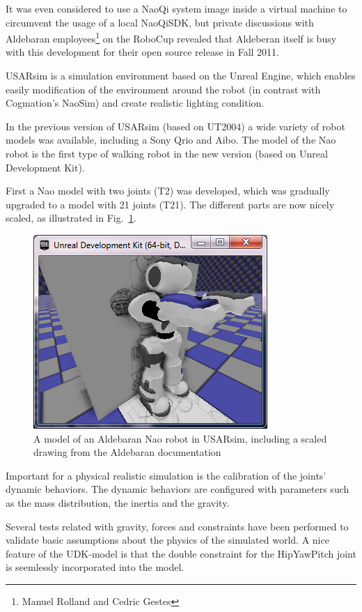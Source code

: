 \documentclass[a4paper]{article}
\begin{document}
It was even considered to use a NaoQi system image inside a virtual machine to circumvent the usage of a local NaoQiSDK, but private discussions with Aldebaran employees\footnote{Manuel Rolland and Cedric Gestes} on the RoboCup revealed that Aldeberan itself is busy with this development for their open source release in Fall 2011. 

USARsim is a simulation environment based on the Unreal Engine, which enables easily modification of the environment around the robot (in contrast with Cogmation's NaoSim) and create realistic lighting condition.  

In the previous version of USARsim (based on UT2004) a wide variety of robot models was available, including a Sony Qrio and Aibo. The model of the Nao robot is the first type of walking robot in the new version (based on Unreal Development Kit).  

First a Nao model with two joints (T2) was developed, which was gradually upgraded to a model with 21 joints (T21). The different parts are now nicely scaled, as illustrated in Fig.~\ref{fig:nao_scaled}.

\begin{figure}[hbt]        
\centering\includegraphics[width=.5\columnwidth]{nao33_correctheight.png}
\caption{A model of an Aldebaran Nao robot in USARsim, including a scaled drawing from the Aldebaran documentation}\label{fig:nao_scaled}
\end{figure}

Important for a physical realistic simulation is the calibration of the joints' dynamic behaviors. The dynamic behaviors are configured with parameters such as the mass distribution, the inertia and the gravity. 

Several tests related with gravity, forces and constraints have been performed to validate basic assumptions about the physics of the simulated world. A nice feature of the UDK-model is that the double constraint for the HipYawPitch joint is seemlessly incorporated into the model.
\end{document}
